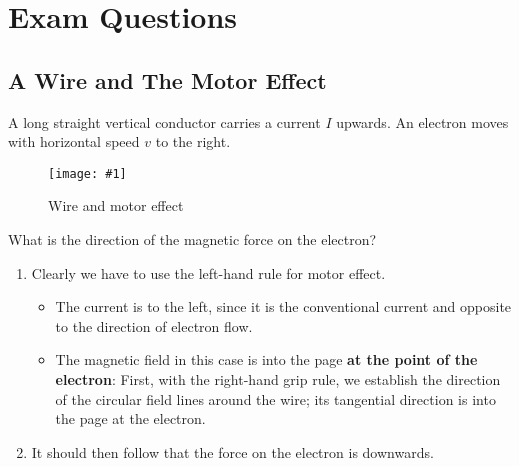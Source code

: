 \documentclass[a4paper,12pt]{article}
\let\oldsection\section
\renewcommand\section{\clearpage\oldsection}
\newcommand{\img}[4]{\begin{center}
  \begin{figure}[H]
    \centering
    \texttt{[image: \#1]}
    \caption{#3}
    \label{fig:#4}
  \end{figure}
\end{center}}
\begin{document}
\pagebreak

\section{Exam Questions}

\subsection{A Wire and The Motor Effect}

A long straight vertical conductor carries a current $I$ upwards. An electron moves with horizontal speed $v$ to the right.

\img{ex/wiremotor.png}{0.25}{Wire and motor effect}{wiremotor}

What is the direction of the magnetic force on the electron?
\begin{enumerate}
  \item Clearly we have to use the left-hand rule for motor effect.
        \begin{itemize}
          \item The current is to the left, since it is the conventional current and opposite to the direction of electron flow.
          \item The magnetic field in this case is into the page \textbf{at the point of the electron}: First, with the right-hand grip rule, we establish the direction of the circular field lines around the wire; its tangential direction is into the page at the electron.
        \end{itemize}
  \item It should then follow that the force on the electron is downwards.
\end{enumerate}
\end{document}

